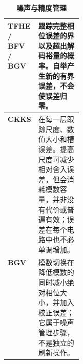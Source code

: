 \begin{table}[htbp]
\small
\renewcommand{\arraystretch}{1.15}
\begin{tabularx}{\linewidth}{|p{0.17\linewidth}|X|}
\hline
\textbf{TFHE / BFV / BGV}&跟踪完整相位误差的界以及超出解码裕量的概率。自举产生新的有界误差，不会使误差归零。\\\hline
\textbf{CKKS}&在每一层跟踪尺度、数值大小和槽误差。提高尺度可减少相对舍入误差，但会消耗模数容量，并非没有代价或普遍有效；误差在每个电路中也不必单调增加。\\\hline
\textbf{BGV}&模数切换在降低模数的同时减小绝对相位大小，并加入校正误差；它属于噪声管理步骤，不是独立的刷新操作。\\\hline
\end{tabularx}
\caption{\textbf{噪声与精度管理}}
\end{table}
